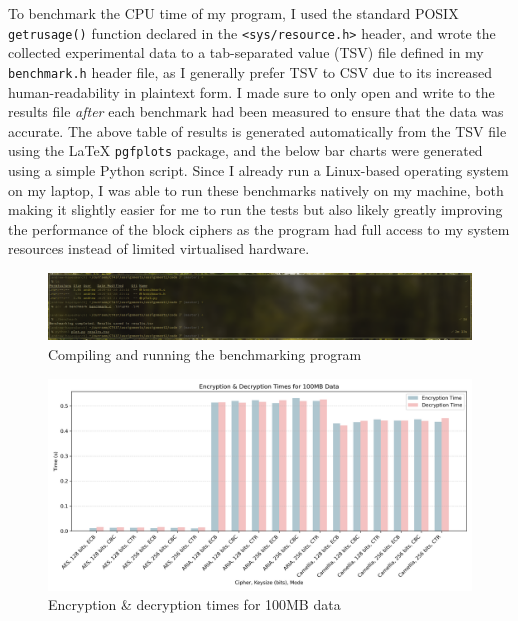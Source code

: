 \documentclass[a4paper]{article}
\begin{document}
To benchmark the CPU time of my program, I used the standard POSIX \texttt{getrusage()} function declared in the \texttt{<sys/resource.h>} header, and wrote the collected experimental data to a tab-separated value (TSV) file defined in my \verb|benchmark.h| header file, as I generally prefer TSV to CSV due to its increased human-readability in plaintext form.
I made sure to only open and write to the results file \textit{after} each benchmark had been measured to ensure that the data was accurate.
The above table of results is generated automatically from the TSV file using the {\LaTeX} \texttt{pgfplots} package, and the below bar charts were generated using a simple Python script.
Since I already run a Linux-based operating system on my laptop, I was able to run these benchmarks natively on my machine, both making it slightly easier for me to run the tests but also likely greatly improving the performance of the block ciphers as the program had full access to my system resources instead of limited virtualised hardware.

\begin{figure}[H]
    \centering
    \includegraphics[width=\textwidth]{./images/one.png}
    \caption{ Compiling and running the benchmarking program }
\end{figure}

\begin{figure}[H]
    \centering
    \includegraphics[width=\textwidth]{./images/100mb.png}
    \caption{Encryption \& decryption times for 100MB data}
\end{figure}
\end{document}
